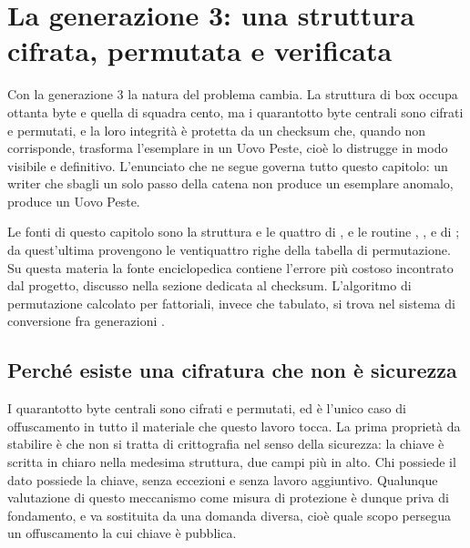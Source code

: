 
\chapter{La generazione 3: una struttura cifrata, permutata e verificata}
\label{cap:cifratura}

Con la generazione 3 la natura del problema cambia. La struttura di box occupa ottanta byte e quella di squadra cento, ma i quarantotto byte centrali sono cifrati e permutati, e la loro integrità è protetta da un checksum che, quando non corrisponde, trasforma l'esemplare in un Uovo Peste, cioè lo distrugge in modo visibile e definitivo. L'enunciato che ne segue governa tutto questo capitolo: un writer che sbagli un solo passo della catena non produce un esemplare anomalo, produce un Uovo Peste.

Le fonti di questo capitolo sono la struttura  e le quattro  di , e le routine , ,  e  di  \cite{pokeemerald}; da quest'ultima provengono le ventiquattro righe della tabella di permutazione. Su questa materia la fonte enciclopedica contiene l'errore più costoso incontrato dal progetto, discusso nella sezione dedicata al checksum. L'algoritmo di permutazione calcolato per fattoriali, invece che tabulato, si trova nel sistema di conversione fra generazioni \cite{pccs}.

\section{Perché esiste una cifratura che non è sicurezza}

I quarantotto byte centrali sono cifrati e permutati, ed è l'unico caso di offuscamento in tutto il materiale che questo lavoro tocca. La prima proprietà da stabilire è che non si tratta di crittografia nel senso della sicurezza: la chiave è scritta in chiaro nella medesima struttura, due campi più in alto. Chi possiede il dato possiede la chiave, senza eccezioni e senza lavoro aggiuntivo. Qualunque valutazione di questo meccanismo come misura di protezione è dunque priva di fondamento, e va sostituita da una domanda diversa, cioè quale scopo persegua un offuscamento la cui chiave è pubblica.

